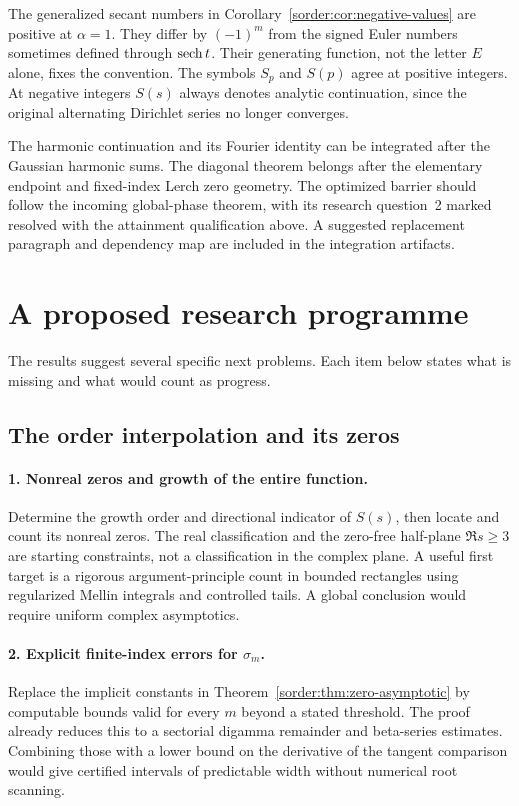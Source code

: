 The generalized secant numbers in
Corollary~\ref{sorder:cor:negative-values} are positive at $\alpha=1$.
They differ by $(-1)^m$ from the signed Euler numbers sometimes defined
through $\operatorname{sech} t$. Their generating function, not the letter $E$ alone,
fixes the convention.
The symbols $S_p$ and $S(p)$ agree at positive integers. At negative
integers $S(s)$ always denotes analytic continuation, since the
original alternating Dirichlet series no longer converges.

The harmonic continuation and its Fourier identity can be integrated
after the Gaussian harmonic sums. The diagonal theorem belongs after
the elementary endpoint and fixed-index Lerch zero geometry. The
optimized barrier should follow the incoming global-phase theorem,
with its research question~2 marked resolved with the attainment
qualification above. A suggested replacement paragraph and dependency
map are included in the integration artifacts.

\section{A proposed research programme}
\label{sec:programme}

The results suggest several specific next problems. Each item below
states what is missing and what would count as progress.

\subsection{The order interpolation and its zeros}

\paragraph{1. Nonreal zeros and growth of the entire function.}
Determine the growth order and directional indicator of $S(s)$, then
locate and count its nonreal zeros. The real classification and the
zero-free half-plane $\Re s\ge3$ are starting constraints, not a
classification in the complex plane. A useful first target is a rigorous
argument-principle count in bounded rectangles using regularized Mellin
integrals and controlled tails. A global conclusion would require
uniform complex asymptotics.

\paragraph{2. Explicit finite-index errors for $\sigma_m$.}
Replace the implicit constants in
Theorem~\ref{sorder:thm:zero-asymptotic} by computable bounds valid for
every $m$ beyond a stated threshold. The proof already reduces this
to a sectorial digamma remainder and beta-series estimates.
Combining those with a lower bound on the derivative of the tangent
comparison would give certified intervals of predictable width
without numerical root scanning.


